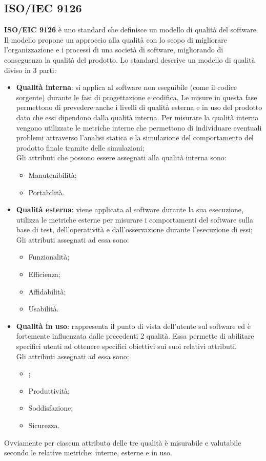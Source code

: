 \documentclass[../norme-di-progetto.tex]{subfiles}
\begin{document}
\subsection{ISO/IEC 9126}%
\label{sec:iso/iec_9126}
\textbf{ISO/EIC 9126} è uno standard che definisce un modello di qualità del software. Il modello propone un approccio alla qualità con lo scopo di migliorare l'organizzazione e i processi di una società di software, migliorando di conseguenza la qualità del prodotto.
Lo standard descrive un modello di qualità diviso in 3 parti:
\begin{itemize}
    \item \textbf{Qualità interna}: si applica al software non eseguibile (come il codice sorgente) durante le fasi di progettazione e codifica.
    Le misure in questa fase permettono di prevedere anche i livelli di qualità esterna e in uso del prodotto dato che essi dipendono dalla qualità interna.
    Per misurare la qualità interna vengono utilizzate le metriche interne che permettono di individuare eventuali problemi attraverso l'analisi statica e la simulazione del comportamento del prodotto finale tramite delle simulazioni;
    \\Gli attributi che possono essere assegnati alla qualità interna sono:
    \begin{itemize}
        \item Manutenibilità;
        \item Portabilità.
    \end{itemize}
    \item \textbf{Qualità esterna}: viene applicata al software durante la sua esecuzione, utilizza le metriche esterne per misurare i comportamenti del software sulla base di test, dell'operatività e dall'osservazione durante l'esecuzione di essi;
    \\Gli attributi assegnati ad essa sono:
    \begin{itemize}
        \item Funzionalità;
        \item Efficienza;
        \item Affidabilità;
        \item Usabilità.
    \end{itemize}
    \item \textbf{Qualità in uso}: rappresenta il punto di vista dell'utente sul software ed è fortemente influenzata dalle precedenti 2 qualità. Essa permette di abilitare specifici utenti ad ottenere specifici obiettivi sui suoi relativi attributi.
    \\Gli attributi assegnati ad essa sono:
    \begin{itemize}
        \item {};
        \item Produttività;
        \item Soddisfazione;
        \item Sicurezza.
    \end{itemize}
\end{itemize}
Ovviamente per ciascun attributo delle tre qualità è misurabile e valutabile secondo le relative metriche: interne, esterne e in uso.
\end{document}
